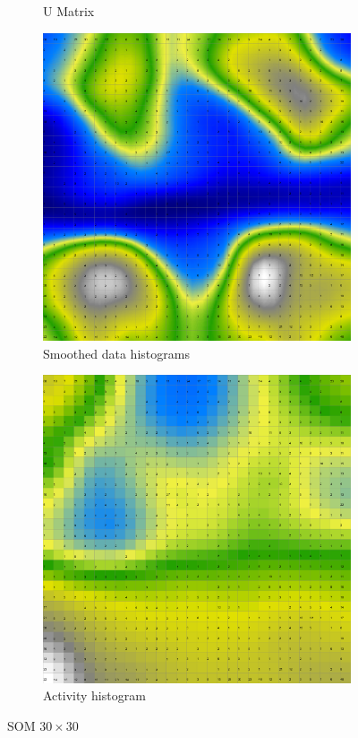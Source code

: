 \documentclass{acm_proc_article-sp}
\begin{document}
\begin{figure}
\begin{subfigure}[b]{0.45\linewidth}
    \caption{U Matrix}
    \label{fig:wine-big-u-matrix}
\end{subfigure}
\begin{subfigure}[b]{0.45\linewidth}
    \includegraphics[width=\linewidth]{img/wine-big-smoothed-data-histogram}
    \caption{Smoothed data histograms}
    \label{fig:wine-big-smoothed-data-histogram}
\end{subfigure}
\begin{subfigure}[b]{0.45\linewidth}
    \includegraphics[width=\linewidth]{img/wine-big-activity-histogram}
    \caption{Activity histogram}
    \label{fig:wine-big-activity-histogram}
\end{subfigure}
\caption{SOM $30\times30$}
\end{figure}
\end{document}
